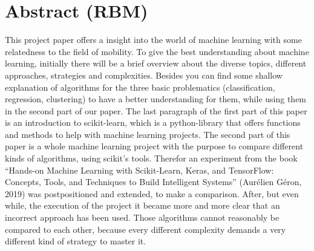 \section*{Abstract (RBM)}
This project paper offers a insight into the world of machine learning with some relatedness to the field of mobility. 
To give the best understanding about machine learning, initially there will be a brief overview about the diverse topics, different approaches, strategies and complexities. Besides you can find some shallow explanation of algorithms for the three basic problematics (classification, regression, clustering) to have a better understanding for them, while using them in the second part of our paper.
The last paragraph of the first part of this paper is an introduction to scikit-learn, which is a python-library that offers functions and methods to help with machine learning projects.
The second part of this paper is a whole machine learning project with the purpose to compare different kinds of algorithms, using scikit’s tools. Therefor an experiment from the book “Hands-on Machine Learning with Scikit-Learn, Keras, and TensorFlow: Concepts, Tools, and Techniques to Build Intelligent Systems” (Aurélien Géron, 2019) was postpositioned and extended, to make a comparison.
After, but even while, the execution of the project it became more and more clear that an incorrect approach has been used. Those algorithms cannot reasonably be compared to each other, because every different complexity demands a very different kind of strategy to master it. 
\vfill\vfill\vfill\vfill\vfill\vfill